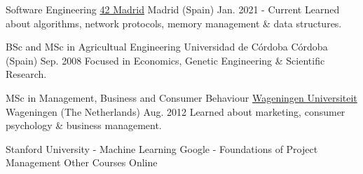 
\begin{cventries}

  \cventry
    {Software Engineering} %
    {\href{https://42.fr/en/homepage/}{42 Madrid}} %
    {Madrid (Spain)} %
    {Jan. 2021 - Current} %
    {
      {Learned about algorithms, network protocols, memory management \& data structures.}
    }

  \cventry
    {BSc and MSc in Agricultual Engineering} %
    {Universidad de Córdoba} %
    {Córdoba (Spain)} %
    {Sep. 2008} %
    {
      {Focused in Economics, Genetic Engineering \& Scientific Research.}
    }

  \cventry
    {MSc in Management, Business and Consumer Behaviour} %
    {\href{https://www.wur.nl/en.htm}{Wageningen Universiteit}} %
    {Wageningen (The Netherlands)} %
    {Aug. 2012} %
    {
      {Learned about marketing, consumer psychology \& business management.}
    }

  \cventry
    {Stanford University - Machine Learning \break Google - Foundations of Project Management} %
    {Other Courses} %
    {Online} %
    {} %
    {
    }



\end{cventries}
